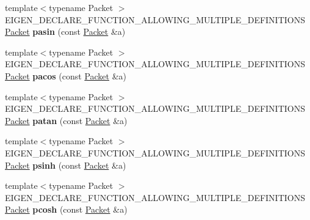 \begin{DoxyCompactItemize}
\item 
\mbox{\label{namespace_eigen_1_1internal_acee867f0d298a2ee29adaa8de889eb5b}} 
{\footnotesize template$<$typename Packet $>$ }\\E\+I\+G\+E\+N\+\_\+\+D\+E\+C\+L\+A\+R\+E\+\_\+\+F\+U\+N\+C\+T\+I\+O\+N\+\_\+\+A\+L\+L\+O\+W\+I\+N\+G\+\_\+\+M\+U\+L\+T\+I\+P\+L\+E\+\_\+\+D\+E\+F\+I\+N\+I\+T\+I\+O\+NS \hyperlink{union_eigen_1_1internal_1_1_packet}{Packet} {\bfseries pasin} (const \hyperlink{union_eigen_1_1internal_1_1_packet}{Packet} \&a)
\item 
\mbox{\label{namespace_eigen_1_1internal_a64a02960f71e0cbed5ce852e564fbd10}} 
{\footnotesize template$<$typename Packet $>$ }\\E\+I\+G\+E\+N\+\_\+\+D\+E\+C\+L\+A\+R\+E\+\_\+\+F\+U\+N\+C\+T\+I\+O\+N\+\_\+\+A\+L\+L\+O\+W\+I\+N\+G\+\_\+\+M\+U\+L\+T\+I\+P\+L\+E\+\_\+\+D\+E\+F\+I\+N\+I\+T\+I\+O\+NS \hyperlink{union_eigen_1_1internal_1_1_packet}{Packet} {\bfseries pacos} (const \hyperlink{union_eigen_1_1internal_1_1_packet}{Packet} \&a)
\item 
\mbox{\label{namespace_eigen_1_1internal_aeb4feddd9334c4ddff94450e2f19e96c}} 
{\footnotesize template$<$typename Packet $>$ }\\E\+I\+G\+E\+N\+\_\+\+D\+E\+C\+L\+A\+R\+E\+\_\+\+F\+U\+N\+C\+T\+I\+O\+N\+\_\+\+A\+L\+L\+O\+W\+I\+N\+G\+\_\+\+M\+U\+L\+T\+I\+P\+L\+E\+\_\+\+D\+E\+F\+I\+N\+I\+T\+I\+O\+NS \hyperlink{union_eigen_1_1internal_1_1_packet}{Packet} {\bfseries patan} (const \hyperlink{union_eigen_1_1internal_1_1_packet}{Packet} \&a)
\item 
\mbox{\label{namespace_eigen_1_1internal_ac935e0dedebb638e45e9c6f762bfea78}} 
{\footnotesize template$<$typename Packet $>$ }\\E\+I\+G\+E\+N\+\_\+\+D\+E\+C\+L\+A\+R\+E\+\_\+\+F\+U\+N\+C\+T\+I\+O\+N\+\_\+\+A\+L\+L\+O\+W\+I\+N\+G\+\_\+\+M\+U\+L\+T\+I\+P\+L\+E\+\_\+\+D\+E\+F\+I\+N\+I\+T\+I\+O\+NS \hyperlink{union_eigen_1_1internal_1_1_packet}{Packet} {\bfseries psinh} (const \hyperlink{union_eigen_1_1internal_1_1_packet}{Packet} \&a)
\item 
\mbox{\label{namespace_eigen_1_1internal_a7b54ef094f23cfbc2bcc5c03b6c27888}} 
{\footnotesize template$<$typename Packet $>$ }\\E\+I\+G\+E\+N\+\_\+\+D\+E\+C\+L\+A\+R\+E\+\_\+\+F\+U\+N\+C\+T\+I\+O\+N\+\_\+\+A\+L\+L\+O\+W\+I\+N\+G\+\_\+\+M\+U\+L\+T\+I\+P\+L\+E\+\_\+\+D\+E\+F\+I\+N\+I\+T\+I\+O\+NS \hyperlink{union_eigen_1_1internal_1_1_packet}{Packet} {\bfseries pcosh} (const \hyperlink{union_eigen_1_1internal_1_1_packet}{Packet} \&a)

\end{DoxyCompactItemize}
